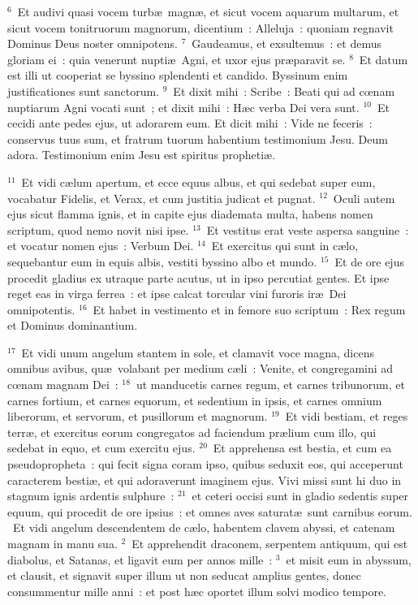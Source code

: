 ${}^{6}$~Et audivi quasi vocem turb\ae\ magn\ae , et sicut vocem aquarum multarum, et sicut vocem tonitruorum magnorum, dicentium~: Alleluja~: quoniam regnavit Dominus Deus noster omnipotens.
${}^{7}$~Gaudeamus, et exsultemus~: et demus gloriam ei~: quia venerunt nupti\ae\ Agni, et uxor ejus pr\ae paravit se.
${}^{8}$~Et datum est illi ut cooperiat se byssino splendenti et candido. Byssinum enim justificationes sunt sanctorum.
${}^{9}$~Et dixit mihi~: Scribe~: Beati qui ad cœnam nuptiarum Agni vocati sunt~; et dixit mihi~: H\ae c verba Dei vera sunt.
${}^{10}$~Et cecidi ante pedes ejus, ut adorarem eum. Et dicit mihi~: Vide ne feceris~: conservus tuus sum, et fratrum tuorum habentium testimonium Jesu. Deum adora. Testimonium enim Jesu est spiritus propheti\ae .


${}^{11}$~Et vidi c\ae lum apertum, et ecce equus albus, et qui sedebat super eum, vocabatur Fidelis, et Verax, et cum justitia judicat et pugnat.
${}^{12}$~Oculi autem ejus sicut flamma ignis, et in capite ejus diademata multa, habens nomen scriptum, quod nemo novit nisi ipse.
${}^{13}$~Et vestitus erat veste aspersa sanguine~: et vocatur nomen ejus~: Verbum Dei.
${}^{14}$~Et exercitus qui sunt in c\ae lo, sequebantur eum in equis albis, vestiti byssino albo et mundo.
${}^{15}$~Et de ore ejus procedit gladius ex utraque parte acutus, ut in ipso percutiat gentes. Et ipse reget eas in virga ferrea~: et ipse calcat torcular vini furoris ir\ae\ Dei omnipotentis.
${}^{16}$~Et habet in vestimento et in femore suo scriptum~: Rex regum et Dominus dominantium.


${}^{17}$~Et vidi unum angelum stantem in sole, et clamavit voce magna, dicens omnibus avibus, qu\ae\ volabant per medium c\ae li~: Venite, et congregamini ad cœnam magnam Dei~:
${}^{18}$~ut manducetis carnes regum, et carnes tribunorum, et carnes fortium, et carnes equorum, et sedentium in ipsis, et carnes omnium liberorum, et servorum, et pusillorum et magnorum.
${}^{19}$~Et vidi bestiam, et reges terr\ae , et exercitus eorum congregatos ad faciendum pr\ae lium cum illo, qui sedebat in equo, et cum exercitu ejus.
${}^{20}$~Et apprehensa est bestia, et cum ea pseudopropheta~: qui fecit signa coram ipso, quibus seduxit eos, qui acceperunt caracterem besti\ae , et qui adoraverunt imaginem ejus. Vivi missi sunt hi duo in stagnum ignis ardentis sulphure~:
${}^{21}$~et ceteri occisi sunt in gladio sedentis super equum, qui procedit de ore ipsius~: et omnes aves saturat\ae\ sunt carnibus eorum.
~Et vidi angelum descendentem de c\ae lo, habentem clavem abyssi, et catenam magnam in manu sua.
${}^{2}$~Et apprehendit draconem, serpentem antiquum, qui est diabolus, et Satanas, et ligavit eum per annos mille~:
${}^{3}$~et misit eum in abyssum, et clausit, et signavit super illum ut non seducat amplius gentes, donec consummentur mille anni~: et post h\ae c oportet illum solvi modico tempore.


